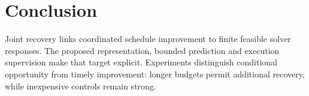 \section{Conclusion}
Joint recovery links coordinated schedule improvement to finite feasible
solver responses. The proposed representation, bounded prediction and execution
supervision make that target explicit. Experiments distinguish conditional
opportunity from timely improvement: longer budgets permit additional recovery,
while inexpensive controls remain strong.
